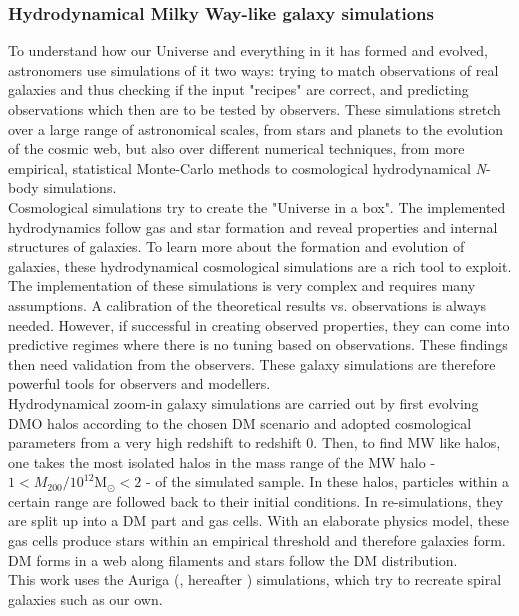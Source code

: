 \subsubsection{Hydrodynamical Milky Way-like galaxy simulations}\label{subsubsec:hydro_sim}
To understand how our Universe and everything in it has formed and evolved, astronomers use simulations of it two ways: trying to match observations of real galaxies and thus checking if the input "recipes" are correct, and predicting observations which then are to be tested by observers. These simulations stretch over a large range of astronomical scales, from stars and planets to the evolution of the cosmic web, but also over different numerical techniques, from more empirical, statistical Monte-Carlo methods to cosmological hydrodynamical \textit{N}-body simulations. \\Cosmological simulations try to create the "Universe in a box". The implemented hydrodynamics follow gas and star formation and reveal properties and internal structures of galaxies. To learn more about the formation and evolution of galaxies, these hydrodynamical cosmological simulations are a rich tool to exploit. The implementation of these simulations is very complex and requires many assumptions. A calibration of the theoretical results vs. observations is always needed. However, if successful in creating observed properties, they can come into predictive regimes where there is no tuning based on observations. These findings then need validation from the observers. These galaxy simulations are therefore powerful tools for observers and modellers.
\\Hydrodynamical zoom-in galaxy simulations are carried out by first evolving \ac{DMO} halos according to the chosen \ac{DM} scenario and adopted cosmological parameters from a very high redshift to redshift 0. Then, to find \ac{MW} like halos, one takes the most isolated halos in the mass range of the \ac{MW} halo - $1 < M_{200} / 10^{12} \mathrm{M}_\odot < 2$ - of the simulated sample. In these halos, particles within a certain range are followed back to their initial conditions. In re-simulations, they are split up into a \ac{DM} part and gas cells. With an elaborate physics model, these gas cells produce stars within an empirical threshold and therefore galaxies form. \ac{DM} forms in a web along filaments and stars follow the \ac{DM} distribution. 
\\This work uses the Auriga (\citealp{AurigaGrand}, hereafter ) simulations, which try to recreate spiral galaxies such as our own. 
